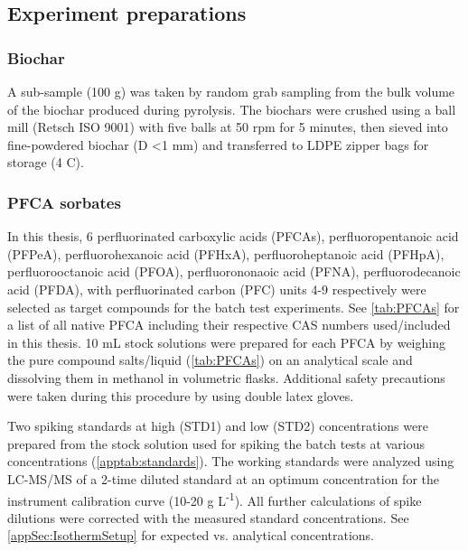 \subsection{Experiment preparations}
\subsubsection{Biochar}
A sub-sample (100 g) was taken by random grab sampling from the bulk volume of the biochar produced during pyrolysis. The biochars were crushed using a ball mill (Retsch ISO 9001) with five balls at 50 rpm for 5 minutes, then sieved into fine-powdered biochar (D \textless 1 mm) and transferred to LDPE zipper bags for storage (4 \textdegree C). 

\subsubsection{PFCA sorbates}\label{sec:PFCAanalytic}
In this thesis, 6 perfluorinated carboxylic acids (PFCAs), perfluoropentanoic acid (PFPeA), perfluorohexanoic acid (PFHxA), perfluoroheptanoic acid (PFHpA), perfluorooctanoic acid (PFOA), perfluorononaoic acid (PFNA), perfluorodecanoic acid (PFDA), with perfluorinated carbon (PFC) units 4-9 respectively were selected as target compounds for the batch test experiments. See \cref{tab:PFCAs} for a list of all native PFCA including their respective CAS numbers used/included in this thesis. 10 mL stock solutions were prepared for each PFCA by weighing the pure compound salts/liquid (\cref{tab:PFCAs}) on an analytical scale and dissolving them in methanol in volumetric flasks. Additional safety precautions were taken during this procedure by using double latex gloves. 

Two spiking standards at high (STD1) and low (STD2) concentrations were prepared from the stock solution used for spiking the batch tests at various concentrations (\cref{apptab:standards}). The working standards were analyzed using LC-MS/MS of a 2-time diluted standard at an optimum concentration for the instrument calibration curve (10-20 \textmu g L\textsuperscript{-1}). All further calculations of spike dilutions were corrected with the measured standard concentrations. See \cref{appSec:IsothermSetup} for expected vs. analytical concentrations. 



